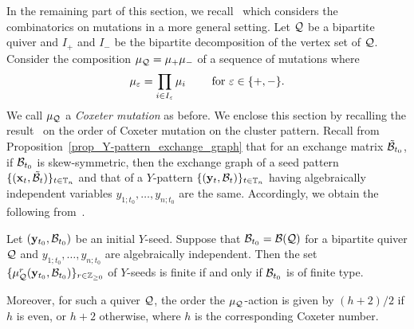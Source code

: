 In the remaining part of this section, we recall~\cite{FZ4_2007} which
considers the combinatorics on mutations in a more general setting. Let
$\mathcal{Q}$ be a bipartite quiver and $I_+$ and $I_-$ be the bipartite
decomposition of the vertex set of $\mathcal{Q}$. Consider the composition
$\mu_{\mathcal{Q}} = \mu_+ \mu_-$ of a sequence of mutations where
\[
    \mu_{\varepsilon} = \prod_{i \in I_{\varepsilon}} \mu_i \qquad \text{ for } \varepsilon \in \{ +, -\}.
\]
We call $\mu_{\mathcal{Q}}$ a \emph{Coxeter mutation} as before.
We enclose this section by recalling the result~\cite[Theorem~8.8]{FZ4_2007}  on the order of Coxeter mutation on the cluster pattern. 
Recall from Proposition~\ref{prop_Y-pattern_exchange_graph} that for an exchange matrix $\mathcal{\tilde{B}}_{t_0}$, if $\mathcal{B}_{t_0}$ is skew-symmetric, then the exchange graph of a seed pattern $\{(\mathbf{x}_t,\mathcal{\tilde{B}}_t)\}_{t\in \mathbb{T}_n}$ and that of a $Y$-pattern $\{(\mathbf{y}_t, \mathcal{B}_{t})\}_{t\in\mathbb{T}_n}$ having algebraically independent variables $y_{1;t_0},\dots,y_{n;t_0}$ are the same. Accordingly, we obtain the following from~\cite[Theorem~8.8]{FZ4_2007}.
\begin{lemma}[{cf. \cite[Theorem~8.8]{FZ4_2007}}]\label{lemma:order of coxeter mutation}
Let $(\mathbf{y}_{t_0}, \mathcal{B}_{t_0})$ be an initial $Y$-seed. Suppose
that $\mathcal{B}_{t_0} = \mathcal{B}(\mathcal{Q})$ for a
bipartite quiver $\mathcal{Q}$
and $y_{1;t_0},\dots,y_{n;t_0}$ are algebraically independent.
Then the set $\{ \mu_{\mathcal{Q}}^r (\mathbf{y}_{t_0}, \mathcal{B}_{t_0}) \}_{r \in \mathbb{Z}_{\geq 0}}$ 
of $Y$-seeds is finite if and only if $\mathcal{B}_{t_0}$ is of
finite type.

Moreover, for such a quiver $\mathcal{Q}$, the order the $\mu_{\mathcal{Q}}$-action is given by $(h+2)/2$ if $h$ is even, or $h+2$ otherwise, where $h$ is the corresponding Coxeter number.
\end{lemma}



